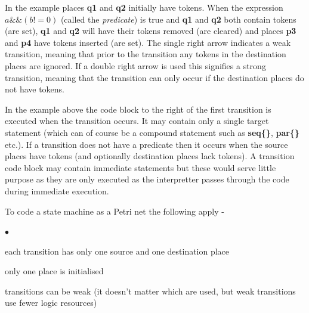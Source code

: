 \documentclass[10pt,a4paper,twoside,fleqn]{article}
\newcommand{\blist}{\begin{list}{$\bullet$}{\setlength{\itemsep}{-5pt}\setlength{\topsep}{-5pt}}}
\newcommand{\blend}{\end{list}}
\newcommand{\var}[1]{{\bf #1}} %
\begin{document}
    In the example places \var{q1} and \var{q2} initially have tokens. When the
    expression $a \&\& (b != 0)$ (called the {\em predicate}) is true and \var{q1}
    and \var{q2} both contain tokens (are set), \var{q1} and \var{q2} will have
    their tokens removed (are cleared) and places \var{p3} and \var{p4} have tokens
    inserted (are set). The single right arrow indicates a weak transition, meaning
    that prior to the transition any tokens in the destination places are ignored.
    If a double right arrow is used this signifies a strong transition, meaning
    that the transition can only occur if the destination places do not have
    tokens.
    
    In the example above the code block to the right of the first transition is
    executed when the transition occurs. It may contain
    only a single target statement (which can of course be a compound statement
    such as  {\bf seq\{\}}, {\bf par\{\}} etc.). If a transition does not have a
    predicate then it occurs when the source places have tokens (and optionally
    destination places lack tokens). A transition code block may contain immediate
    statements but these would serve little purpose as they are only executed as the
    interpretter passes through the code during immediate execution.
    
    To code a state machine as a Petri net the following apply -
    \blist
    \item   each transition has only one source and one destination place
    \item   only one place is initialised
    \item   transitions can be weak (it doesn't matter which are used, but
            weak transitions use fewer logic resources)
    \blend
\end{document}
